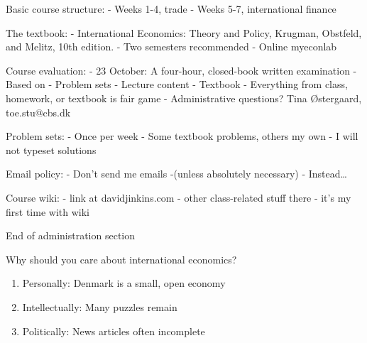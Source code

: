 \begin{frame}

Basic course structure: - Weeks 1-4, trade - Weeks 5-7, international
finance

\end{frame}

\begin{frame}

The textbook: - International Economics: Theory and Policy, Krugman,
Obstfeld, and Melitz, 10th edition. - Two semesters recommended - Online
myeconlab

\end{frame}

\begin{frame}

Course evaluation: - 23 October: A four-hour, closed-book written
examination - Based on - Problem sets - Lecture content - Textbook -
Everything from class, homework, or textbook is fair game -
Administrative questions? Tina Østergaard, toe.stu@cbs.dk

\end{frame}

\begin{frame}

Problem sets: - Once per week - Some textbook problems, others my own -
I will not typeset solutions

\end{frame}

\begin{frame}

Email policy: - Don't send me emails -(unless absolutely necessary) -
Instead\ldots

\end{frame}

\begin{frame}

Course wiki: - link at davidjinkins.com - other class-related stuff
there - it's my first time with wiki

\end{frame}

\begin{frame}

End of administration section

\end{frame}

\begin{frame}

Why should you care about international economics?

\begin{enumerate}
\def\labelenumi{\arabic{enumi}.}
\itemsep1pt\parskip0pt
\item
  Personally: Denmark is a small, open economy
\item
  Intellectually: Many puzzles remain
\item
  Politically: News articles often incomplete
\end{enumerate}

\end{frame}

\begin{frame}

\end{frame}
